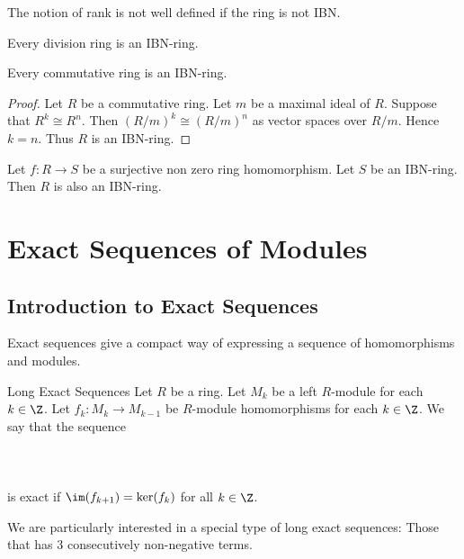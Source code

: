 \documentclass[a4paper]{article}
\begin{document}
The notion of rank is not well defined if the ring is not IBN. 

\begin{prp}{}{} Every division ring is an IBN-ring. 
\end{prp}

\begin{prp}{}{} Every commutative ring is an IBN-ring. 
\begin{proof}
Let $R$ be a commutative ring. Let $m$ be a maximal ideal of $R$. Suppose that $R^k\cong R^n$. Then $(R/m)^k\cong(R/m)^n$ as vector spaces over $R/m$. Hence $k=n$. Thus $R$ is an IBN-ring. 
\end{proof}
\end{prp}

\begin{prp}{}{} Let $f:R\to S$ be a surjective non zero ring homomorphism. Let $S$ be an IBN-ring. Then $R$ is also an IBN-ring. 
\end{prp}

\pagebreak
\section{Exact Sequences of Modules}
\subsection{Introduction to Exact Sequences}
Exact sequences give a compact way of expressing a sequence of homomorphisms and modules. 

\begin{defn}{Long Exact Sequences}{} Let $R$ be a ring. Let $M_k$ be a left $R$-module for each $k\in\Z$. Let $f_k:M_k\to M_{k-1}$ be $R$-module homomorphisms for each $k\in\Z$. We say that the sequence \\~\\
\\~\\
is exact if $\im(f_{k+1})=\ker(f_k)$ for all $k\in\Z$. 
\end{defn}

We are particularly interested in a special type of long exact sequences: Those that has $3$ consecutively non-negative terms. 
\end{document}
